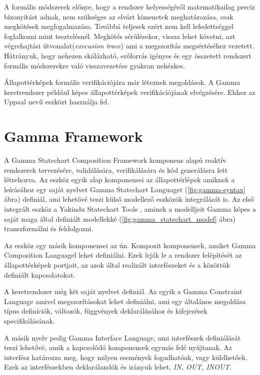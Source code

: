 A formális módszerek előnye, hogy a rendszer helyességéről matematikailag precíz bizonyítást adnak, nem szükséges az elvárt kimenetek meghatározása, csak megkötések megfogalmazása. Továbbá teljesek ezért nem kell lefedettséggel foglalkozni mint tesztelésnél. Megkötés sérülésekor, vissza lehet követni, azt végrehajtási útvonalat(\emph{execusion trace}) ami a megszorítás megsértéséhez vezetett. Hátrányuk, hogy nehezen skálázható, erőforrás igényes és egy összetett rendszert formális módszerekre való visszavezetése gyakran nehézkes.

Állapottérképek formális verifikációjára már léteznek megoldások. A Gamma keretrendszer például képes állapottérképek verifikációjának elvégzésére. Ehhez az Uppaal \cite{bengtsson1995uppaal, bengtsson1998new} nevű eszközt használja fel.

\section{Gamma Framework}
\label{sec:gamma-framework}
A Gamma Statechart Composition Framework\cite{gammaf} komponens alapú reaktív rendszerek tervezésére, validálására, verifikálására és kód generálásra lett létrehozva. Az eszköz egyik alap komponensei az állapottérlépek amiknek a leírásához egy saját nyelvet Gamma Statechart Languaget (\ref{fig:gamma-syntax} ábra) definiál, ami lehetővé teszi külső modellező eszközök integrálását is. Az első integrált eszköz a Yakindu Statechart Tools \cite{toolsyakindu}, aminek a modelljeit Gamma képes a saját maga által definiált modellekké (\ref{fig:gamma_statechart_model} ábra) transzformálni és feldolgozni.

Az eszköz egy másik komponensei az ún. Kompozit komponensek, amiket Gamma Composition Languagel lehet definiálni. Ezek írják le a rendszer felépítését az állapottérképek portjait, az azok által realizált interfészeket és a közöttük definiált kapcsolatokat.

A keretrendszer még két saját nyelvet definiál. Az egyik a Gamma Constraint Language amivel megszorításokat lehet definiálni, ami egy általános megoldása típus definíciók, változók, függvények deklarálásához és kifejezések specifikálásának.

A másik nyelv pedig Gamma Interface Language, ami interfészek definiálását teszi lehetővé, amik a kapcsolódó komponensek egymás felé nyújtanak. Az interfész határozza meg, hogy milyen események fogadhatóak, vagy küldhetőek. Ezek az interfészekben deklarálandók és irányuk lehet, \emph{IN, OUT, INOUT}.

